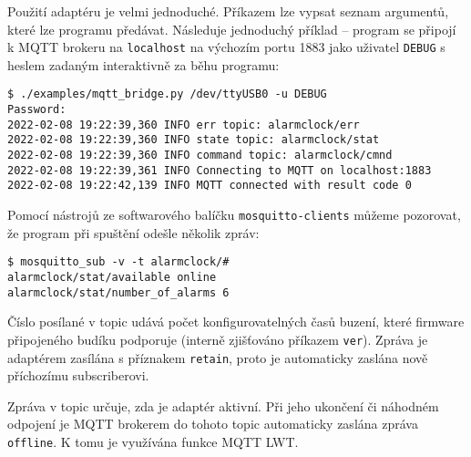 Použití adaptéru je velmi jednoduché. Příkazem 
lze vypsat seznam argumentů, které lze programu předávat.
Následuje jednoduchý příklad -- program se připojí k MQTT brokeru na
\texttt{localhost} na výchozím portu 1883 jako uživatel \texttt{DEBUG} s heslem
zadaným interaktivně za běhu programu:
\begin{lstlisting}[style=terminal]
$ ./examples/mqtt_bridge.py /dev/ttyUSB0 -u DEBUG
Password:
2022-02-08 19:22:39,360 INFO err topic: alarmclock/err
2022-02-08 19:22:39,360 INFO state topic: alarmclock/stat
2022-02-08 19:22:39,360 INFO command topic: alarmclock/cmnd
2022-02-08 19:22:39,361 INFO Connecting to MQTT on localhost:1883
2022-02-08 19:22:42,139 INFO MQTT connected with result code 0

\end{lstlisting}

Pomocí nástrojů ze softwarového balíčku \texttt{mosquitto-clients}
můžeme pozorovat, že program při spuštění odešle několik zpráv:
\begin{lstlisting}[style=terminal]
$ mosquitto_sub -v -t alarmclock/#
alarmclock/stat/available online
alarmclock/stat/number_of_alarms 6
\end{lstlisting}
Číslo posílané v topic  udává počet
konfigurovatelných časů buzení, které firmware připojeného budíku podporuje
(interně zjišťováno příkazem \texttt{ver}). Zpráva je adaptérem zasílána
s příznakem \texttt{retain}, proto je automaticky zaslána nově příchozímu
subscriberovi.

Zpráva v topic  určuje, zda je adaptér
aktivní. Při jeho ukončení či náhodném odpojení je MQTT brokerem do tohoto
topic automaticky zaslána zpráva \texttt{offline}. K tomu je využívána funkce
MQTT \ac{LWT}.


